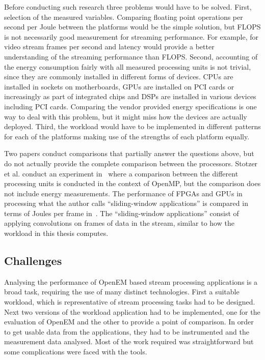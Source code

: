 Before conducting such research three problems would have to be solved. First, selection of the measured variables. Comparing floating point operations per second per Joule between the platforms would be the simple solution, but FLOPS is not necessarily good measurement for streaming performance. For example, for video stream frames per second and latency would provide a better understanding of the streaming performance than FLOPS. Second, accounting of the energy consumption fairly with all measured processing units is not trivial, since they are commonly installed in different forms of devices. CPUs are installed in sockets on motherboards, GPUs are installed on PCI cards or increasingly as part of integrated chips and DSPs are installed in various devices including PCI cards. Comparing the vendor provided energy specifications is one way to deal with this problem, but it might miss how the devices are actually deployed. Third, the workload would have to be implemented in different patterns for each of the platforms making use of the strengths of each platform equally.

Two papers conduct comparisons that partially answer the questions above, but do not actually provide the complete comparison between the processors. Stotzer et al. conduct an experiment in~\cite{stotzer2013openmp} where a comparison between the different processing units is conducted in the context of OpenMP, but the comparison does not include energy measurements. The performance of FPGAs and GPUs in processing what the author calls ``sliding-window applications'' is compared in terms of Joules per frame in~\cite{fowers2012performance}. The ``sliding-window applications'' consist of applying convolutions on frames of data in the stream, similar to how the workload in this thesis computes.

\subsection{Challenges}
\label{subsec:challenges}
Analysing the performance of OpenEM based stream processing applications is a broad task, requiring the use of many distinct technologies. First a suitable workload, which is representative of stream processing tasks had to be designed. Next two versions of the workload application had to be implemented, one for the evaluation of OpenEM and the other to provide a point of comparison. In order to get usable data from the applications, they had to be instrumented and the measurement data analysed. Most of the work required was straightforward but some complications were faced with the tools.

